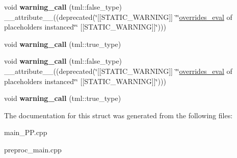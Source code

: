 \begin{DoxyCompactItemize}
\item 
\hypertarget{structtml_1_1overrides__eval_3_01tml_1_1placeholder_3_01I_01_4_01_4_1_1turbo__static__warning82_a16ef56cbf2f1c10b71ec258e6ffd6231}{void {\bfseries warning\+\_\+call} (tml\+::false\+\_\+type) \+\_\+\+\_\+attribute\+\_\+\+\_\+((deprecated(\char`\"{}\mbox{[}\mbox{[}S\+T\+A\+T\+I\+C\+\_\+\+W\+A\+R\+N\+I\+N\+G\mbox{]}\mbox{]} \char`\"{}\char`\"{}\hyperlink{structtml_1_1overrides__eval}{overrides\+\_\+eval} of placeholders instanced\char`\"{}\char`\"{} \mbox{[}\mbox{[}S\+T\+A\+T\+I\+C\+\_\+\+W\+A\+R\+N\+I\+N\+G\mbox{]}\mbox{]}\char`\"{})))}\label{structtml_1_1overrides__eval_3_01tml_1_1placeholder_3_01I_01_4_01_4_1_1turbo__static__warning82_a16ef56cbf2f1c10b71ec258e6ffd6231}

\item 
\hypertarget{structtml_1_1overrides__eval_3_01tml_1_1placeholder_3_01I_01_4_01_4_1_1turbo__static__warning82_ace635ac8d062d570bbbf56b3eaf7918f}{void {\bfseries warning\+\_\+call} (tml\+::true\+\_\+type)}\label{structtml_1_1overrides__eval_3_01tml_1_1placeholder_3_01I_01_4_01_4_1_1turbo__static__warning82_ace635ac8d062d570bbbf56b3eaf7918f}

\item 
\hypertarget{structtml_1_1overrides__eval_3_01tml_1_1placeholder_3_01I_01_4_01_4_1_1turbo__static__warning82_a16ef56cbf2f1c10b71ec258e6ffd6231}{void {\bfseries warning\+\_\+call} (tml\+::false\+\_\+type) \+\_\+\+\_\+attribute\+\_\+\+\_\+((deprecated(\char`\"{}\mbox{[}\mbox{[}S\+T\+A\+T\+I\+C\+\_\+\+W\+A\+R\+N\+I\+N\+G\mbox{]}\mbox{]} \char`\"{}\char`\"{}\hyperlink{structtml_1_1overrides__eval}{overrides\+\_\+eval} of placeholders instanced\char`\"{}\char`\"{} \mbox{[}\mbox{[}S\+T\+A\+T\+I\+C\+\_\+\+W\+A\+R\+N\+I\+N\+G\mbox{]}\mbox{]}\char`\"{})))}\label{structtml_1_1overrides__eval_3_01tml_1_1placeholder_3_01I_01_4_01_4_1_1turbo__static__warning82_a16ef56cbf2f1c10b71ec258e6ffd6231}

\item 
\hypertarget{structtml_1_1overrides__eval_3_01tml_1_1placeholder_3_01I_01_4_01_4_1_1turbo__static__warning82_ace635ac8d062d570bbbf56b3eaf7918f}{void {\bfseries warning\+\_\+call} (tml\+::true\+\_\+type)}\label{structtml_1_1overrides__eval_3_01tml_1_1placeholder_3_01I_01_4_01_4_1_1turbo__static__warning82_ace635ac8d062d570bbbf56b3eaf7918f}

\end{DoxyCompactItemize}


The documentation for this struct was generated from the following files\+:\begin{DoxyCompactItemize}
\item 
main\+\_\+\+P\+P.\+cpp\item 
preproc\+\_\+main.\+cpp\end{DoxyCompactItemize}
